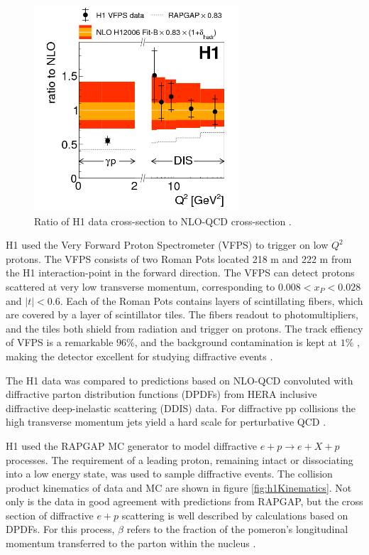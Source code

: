 \begin{figure}[h!]
\begin{centering}
\includegraphics[width=3in]{Chapter1/importfigs/fig8_h1_2015.png}
\par\end{centering}
\caption{Ratio of H1 data cross-section to NLO-QCD cross-section \cite{Andreev:2015cwa}. \label{fig:h1Ratio}}
\end{figure}

H1 used the Very Forward Proton Spectrometer (VFPS) to trigger on low $Q^2$ protons. The VFPS consists of two Roman Pots located 218 m and 222 m from the H1 interaction-point in the forward direction. The VFPS can detect protons scattered at very low transverse momentum, corresponding to $0.008 < x_{P} < 0.028$ and $|t|<0.6$. Each of the Roman Pots contains layers of scintillating fibers, which are covered by a layer of scintillator tiles. The fibers readout to photomultipliers, and the tiles both shield from radiation and trigger on protons. The track effiency of VFPS is a remarkable $96 \%$, and the background contamination is kept at $1 \%$ , making the detector excellent for studying diffractive events \cite{Andreev:2015cwa}.


The H1 data was compared to predictions based on NLO-QCD convoluted with diffractive parton distribution functions (DPDFs) from HERA inclusive diffractive deep-inelastic scattering (DDIS) data. For diffractive pp collisions the high transverse momentum jets yield a hard scale for perturbative QCD \cite{Aaron:2010su}.

H1 used the RAPGAP MC generator to model diffractive $e+p \rightarrow e+X+p$ processes. The requirement of a leading proton, remaining intact or dissociating into a low energy state, was used to sample diffractive events. The collision product kinematics of data and MC are shown in figure \ref{fig:h1Kinematics}. Not only is the data in good agreement with predictions from RAPGAP, but the cross section of diffractive $e+p$ scattering is well described by calculations based on DPDFs. For this process, $\beta$ refers to the fraction of the pomeron's longitudinal momentum transferred to the parton within the nucleus \cite{Aaron:2010aa}. 

